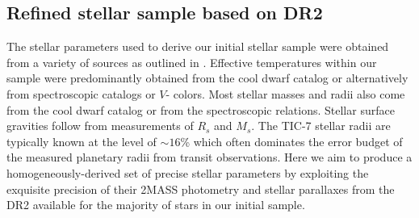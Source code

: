 \subsection{Refined stellar sample based on \gaia{} DR2} \label{sect:gaia}
The stellar parameters used to derive our initial stellar sample were obtained from a variety of sources
as outlined in \cite{stassun17}. Effective temperatures within our sample were predominantly obtained
from the cool dwarf catalog \citep{muirhead18} or alternatively from spectroscopic catalogs or $V$-\Ks{}
colors.
Most stellar masses and radii also come from the cool dwarf catalog or from the \cite{torres10}
spectroscopic relations. Stellar surface gravities follow from measurements of $R_s$ and $M_s$.
The TIC-7 stellar radii are typically known at the level of $\sim 16$\% which often dominates
the error budget of the measured planetary radii from transit observations. Here we aim to produce a
homogeneously-derived set of precise stellar parameters by exploiting the exquisite precision of their
2MASS photometry and stellar parallaxes from the \gaia{} DR2 \cite{gaia18} available for the majority of
stars in our initial sample. \\

